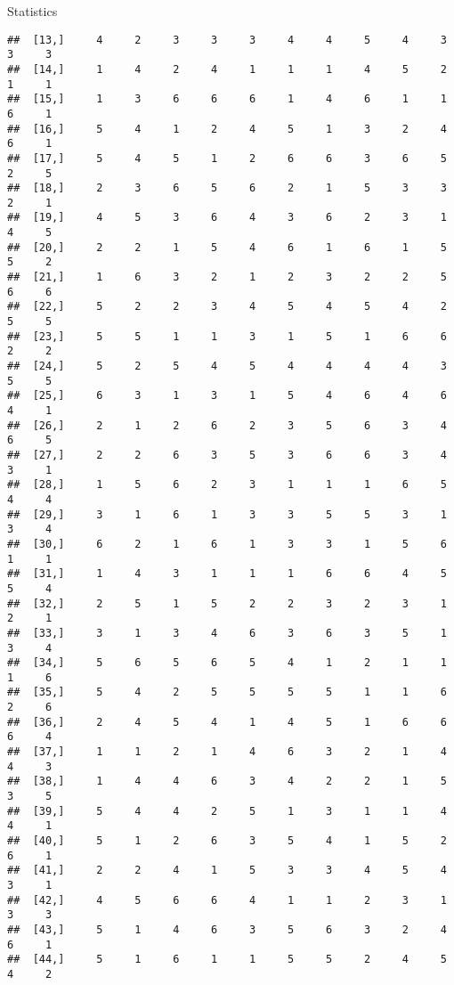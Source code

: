 \documentclass[
  ignorenonframetext,
]{beamer}
\begin{document}
\begin{frame}[fragile]{Statistics}
\begin{verbatim}
##  [13,]     4     2     3     3     3     4     4     5     4     3     3     3
##  [14,]     1     4     2     4     1     1     1     4     5     2     1     1
##  [15,]     1     3     6     6     6     1     4     6     1     1     6     1
##  [16,]     5     4     1     2     4     5     1     3     2     4     6     1
##  [17,]     5     4     5     1     2     6     6     3     6     5     2     5
##  [18,]     2     3     6     5     6     2     1     5     3     3     2     1
##  [19,]     4     5     3     6     4     3     6     2     3     1     4     5
##  [20,]     2     2     1     5     4     6     1     6     1     5     5     2
##  [21,]     1     6     3     2     1     2     3     2     2     5     6     6
##  [22,]     5     2     2     3     4     5     4     5     4     2     5     5
##  [23,]     5     5     1     1     3     1     5     1     6     6     2     2
##  [24,]     5     2     5     4     5     4     4     4     4     3     5     5
##  [25,]     6     3     1     3     1     5     4     6     4     6     4     1
##  [26,]     2     1     2     6     2     3     5     6     3     4     6     5
##  [27,]     2     2     6     3     5     3     6     6     3     4     3     1
##  [28,]     1     5     6     2     3     1     1     1     6     5     4     4
##  [29,]     3     1     6     1     3     3     5     5     3     1     3     4
##  [30,]     6     2     1     6     1     3     3     1     5     6     1     1
##  [31,]     1     4     3     1     1     1     6     6     4     5     5     4
##  [32,]     2     5     1     5     2     2     3     2     3     1     2     1
##  [33,]     3     1     3     4     6     3     6     3     5     1     3     4
##  [34,]     5     6     5     6     5     4     1     2     1     1     1     6
##  [35,]     5     4     2     5     5     5     5     1     1     6     2     6
##  [36,]     2     4     5     4     1     4     5     1     6     6     6     4
##  [37,]     1     1     2     1     4     6     3     2     1     4     4     3
##  [38,]     1     4     4     6     3     4     2     2     1     5     3     5
##  [39,]     5     4     4     2     5     1     3     1     1     4     4     1
##  [40,]     5     1     2     6     3     5     4     1     5     2     6     1
##  [41,]     2     2     4     1     5     3     3     4     5     4     3     1
##  [42,]     4     5     6     6     4     1     1     2     3     1     3     3
##  [43,]     5     1     4     6     3     5     6     3     2     4     6     1
##  [44,]     5     1     6     1     1     5     5     2     4     5     4     2

\end{verbatim}
\end{frame}
\end{document}
